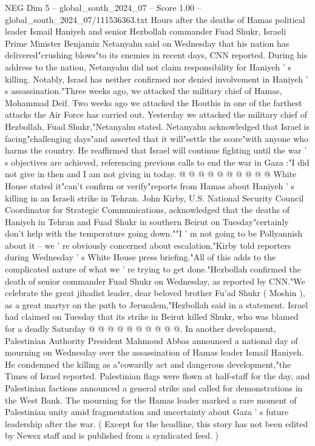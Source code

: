 \begin{textsample}{NEG Dim 5 – global\_south\_2024\_07 – Score 1.00 – global\_south\_2024\_07/111536363.txt}  \label{ex:f5_neg_299}
Hours after the deaths of Hamas political leader Ismail Haniyeh and senior Hezbollah commander Fuad Shukr, Israeli Prime Minister Benjamin Netanyahu said on Wednesday that his nation has delivered"crushing blows"to its enemies in recent days, CNN reported.
During his address to the nation, Netanyahu did not claim responsibility for Haniyeh ' s killing.
Notably, Israel has neither confirmed nor denied involvement in Haniyeh ' s assassination."Three weeks ago, we attacked the military chief of Hamas, Mohammad Deif.
Two weeks ago we attacked the Houthis in one of the farthest attacks the Air Force has carried out.
Yesterday we attacked the military chief of Hezbollah, Fuad Shukr,"Netanyahu stated.
Netanyahu acknowledged that Israel is facing"challenging days"and asserted that it will"settle the score"with anyone who harms the country.
He reaffirmed that Israel will continue fighting until the war ' s objectives are achieved, referencing previous calls to end the war in Gaza :"I did not give in then and I am not giving in today. @ @ @ @ @ @ @ @ @ @ White House stated it"can't confirm or verify"reports from Hamas about Haniyeh ' s killing in an Israeli strike in Tehran.
John Kirby, U.S.
National Security Council Coordinator for Strategic Communications, acknowledged that the deaths of Haniyeh in Tehran and Fuad Shukr in southern Beirut on Tuesday"certainly don't help with the temperature going down.""I ' m not going to be Pollyannish about it -- we ' re obviously concerned about escalation,"Kirby told reporters during Wednesday ' s White House press briefing."All of this adds to the complicated nature of what we ' re trying to get done."Hezbollah confirmed the death of senior commander Fuad Shukr on Wednesday, as reported by CNN."We celebrate the great jihadist leader, dear beloved brother Fu'ad Shukr ( Moshin ), as a great martyr on the path to Jerusalem,"Hezbollah said in a statement.
Israel had claimed on Tuesday that its strike in Beirut killed Shukr, who was blamed for a deadly Saturday @ @ @ @ @ @ @ @ @ @.
In another development, Palestinian Authority President Mahmoud Abbas announced a national day of mourning on Wednesday over the assassination of Hamas leader Ismail Haniyeh.
He condemned the killing as a"cowardly act and dangerous development,"the Times of Israel reported.
Palestinian flags were flown at half-staff for the day, and Palestinian factions announced a general strike and called for demonstrations in the West Bank.
The mourning for the Hamas leader marked a rare moment of Palestinian unity amid fragmentation and uncertainty about Gaza ' s future leadership after the war. ( Except for the headline, this story has not been edited by Newsx staff and is published from a syndicated feed. )

\end{textsample}
